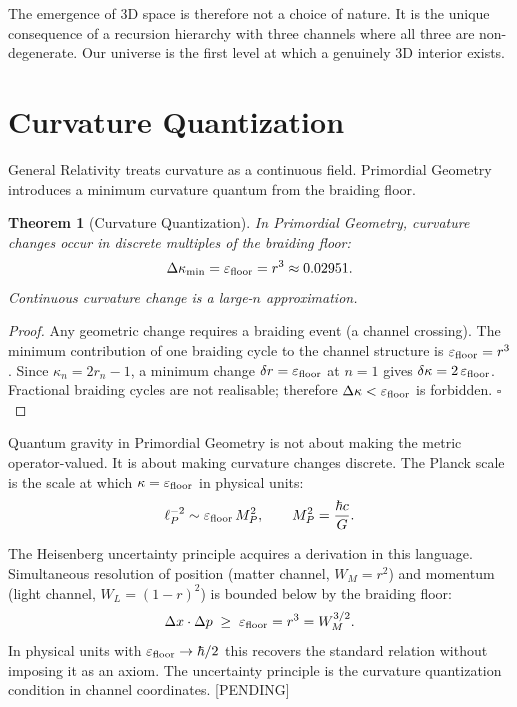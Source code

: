 \documentclass[prd,twocolumn,preprintnumbers,amsmath,amssymb]{revtex4-2}
\newtheorem{theorem}{Theorem}
\newcommand{\pending}{\textcolor{red!70!black}{[PENDING]}}
\newcommand{\WL}{W_{L}}
\newcommand{\WM}{W_{M}}
\begin{document}
The emergence of 3D space is therefore not a choice of nature.  It is the
unique consequence of a recursion hierarchy with three channels where all three
are non-degenerate.  Our universe is the first level at which a genuinely 3D
interior exists.

\section{Curvature Quantization}
\label{sec:quantum}

General Relativity treats curvature as a continuous field.  Primordial Geometry
introduces a minimum curvature quantum from the braiding floor.

\begin{theorem}[Curvature Quantization]
In Primordial Geometry, curvature changes occur in discrete multiples of the
braiding floor:
\begin{equation}
  \Delta\kappa_{\rm min} = \varepsilon_{\rm floor} = r^3 \approx 0.02951.
  \label{eq:Deltakappa}
\end{equation}
Continuous curvature change is a large-$n$ approximation.
\end{theorem}
\begin{proof}
Any geometric change requires a braiding event (a channel crossing).  The
minimum contribution of one braiding cycle to the channel structure is
$\varepsilon_{\rm floor} = r^3$.  Since $\kappa_n = 2r_n - 1$, a minimum
change $\delta r = \varepsilon_{\rm floor}$ at $n=1$ gives $\delta\kappa =
2\,\varepsilon_{\rm floor}$.  Fractional braiding cycles are not realisable;
therefore $\Delta\kappa < \varepsilon_{\rm floor}$ is forbidden. \hfill$\square$
\end{proof}

Quantum gravity in Primordial Geometry is not about making the metric
operator-valued.  It is about making curvature changes discrete.  The Planck
scale is the scale at which $\kappa = \varepsilon_{\rm floor}$ in physical
units:
\begin{equation}
  \ell_P^{-2} \sim \varepsilon_{\rm floor}\, M_P^2,
  \qquad
  M_P^2 = \frac{\hbar c}{G}.
\end{equation}

The Heisenberg uncertainty principle acquires a derivation in this language.
Simultaneous resolution of position (matter channel, $\WM = r^2$) and momentum
(light channel, $\WL = (1-r)^2$) is bounded below by the braiding floor:
\begin{equation}
  \Delta x \cdot \Delta p \;\geq\; \varepsilon_{\rm floor} = r^3 = \WM^{3/2}.
  \label{eq:Heisenberg}
\end{equation}
In physical units with $\varepsilon_{\rm floor} \to \hbar/2$ this recovers the
standard relation without imposing it as an axiom.  The uncertainty principle is
the curvature quantization condition in channel coordinates.  \pending
\end{document}
